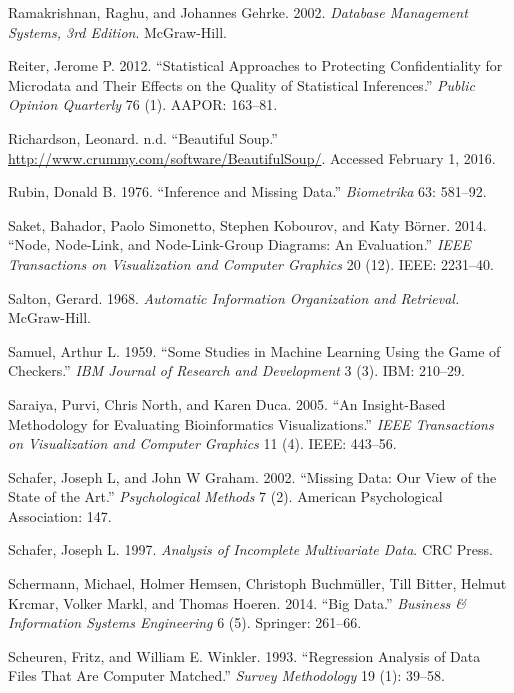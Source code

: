 \documentclass[]{krantz}
\begin{document}
\hypertarget{ref-ramakrishnan2000database}{}
Ramakrishnan, Raghu, and Johannes Gehrke. 2002. \emph{Database
Management Systems, 3rd Edition}. McGraw-Hill.

\hypertarget{ref-reiter2012statistical}{}
Reiter, Jerome P. 2012. ``Statistical Approaches to Protecting
Confidentiality for Microdata and Their Effects on the Quality of
Statistical Inferences.'' \emph{Public Opinion Quarterly} 76 (1). AAPOR:
163--81.

\hypertarget{ref-bsoup}{}
Richardson, Leonard. n.d. ``Beautiful Soup.''
\url{http://www.crummy.com/software/BeautifulSoup/}. Accessed February
1, 2016.

\hypertarget{ref-rubin1976}{}
Rubin, Donald B. 1976. ``Inference and Missing Data.'' \emph{Biometrika}
63: 581--92.

\hypertarget{ref-saket2014node}{}
Saket, Bahador, Paolo Simonetto, Stephen Kobourov, and Katy Börner.
2014. ``Node, Node-Link, and Node-Link-Group Diagrams: An Evaluation.''
\emph{IEEE Transactions on Visualization and Computer Graphics} 20 (12).
IEEE: 2231--40.

\hypertarget{ref-salton-68}{}
Salton, Gerard. 1968. \emph{Automatic Information Organization and
Retrieval.} McGraw-Hill.

\hypertarget{ref-samuel1959some}{}
Samuel, Arthur L. 1959. ``Some Studies in Machine Learning Using the
Game of Checkers.'' \emph{IBM Journal of Research and Development} 3
(3). IBM: 210--29.

\hypertarget{ref-saraiya2005insight}{}
Saraiya, Purvi, Chris North, and Karen Duca. 2005. ``An Insight-Based
Methodology for Evaluating Bioinformatics Visualizations.'' \emph{IEEE
Transactions on Visualization and Computer Graphics} 11 (4). IEEE:
443--56.

\hypertarget{ref-schafer2002missing}{}
Schafer, Joseph L, and John W Graham. 2002. ``Missing Data: Our View of
the State of the Art.'' \emph{Psychological Methods} 7 (2). American
Psychological Association: 147.

\hypertarget{ref-schafer1997analysis}{}
Schafer, Joseph L. 1997. \emph{Analysis of Incomplete Multivariate
Data}. CRC Press.

\hypertarget{ref-schermann2014big}{}
Schermann, Michael, Holmer Hemsen, Christoph Buchmüller, Till Bitter,
Helmut Krcmar, Volker Markl, and Thomas Hoeren. 2014. ``Big Data.''
\emph{Business \& Information Systems Engineering} 6 (5). Springer:
261--66.

\hypertarget{ref-scheuren1993regression}{}
Scheuren, Fritz, and William E. Winkler. 1993. ``Regression Analysis of
Data Files That Are Computer Matched.'' \emph{Survey Methodology} 19
(1): 39--58.
\end{document}

